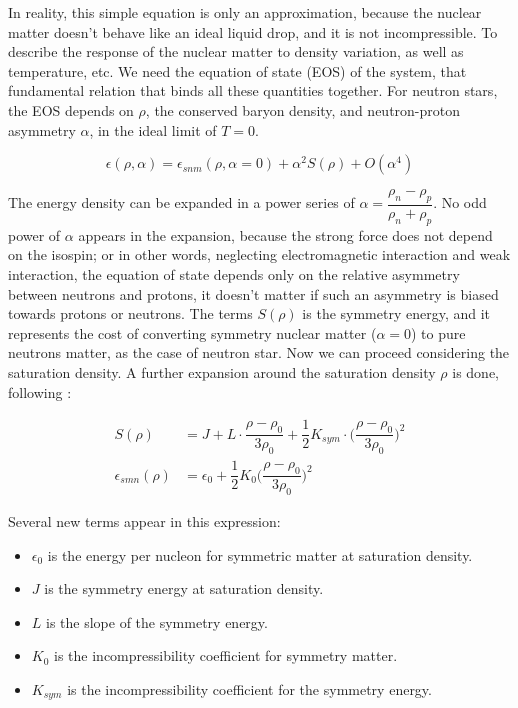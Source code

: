 In reality, this simple equation is only an approximation, because the nuclear matter doesn't behave like an ideal liquid drop, and it is not incompressible. To describe the response of the nuclear matter to density variation, as well as temperature, etc. We need the equation of state (EOS) of the system, that fundamental relation that binds all these quantities together. For neutron stars, the EOS depends on $\rho$, the conserved baryon density, and neutron-proton asymmetry $\alpha$, in the ideal limit of $T = 0$. 

\begin{equation}
\epsilon (\rho,\alpha) = \epsilon_{snm} (\rho, \alpha = 0) + \alpha ^{2} S(\rho) + O(\alpha ^{4})
\end{equation}

The energy density can be expanded in a power series of $\alpha = \dfrac{\rho_{n} - \rho_{p}}{\rho_{n} + \rho_{p}}$. No odd power of $\alpha$ appears in the expansion, because the strong force does not depend on the isospin; or in other words, neglecting electromagnetic interaction and weak interaction, the equation of state depends only on the relative asymmetry between neutrons and protons, it doesn't matter if such an asymmetry is biased towards protons or neutrons. The terms $S(\rho)$ is the symmetry energy, and it represents the cost of converting symmetry nuclear matter ($\alpha = 0$) to pure neutrons matter, as the case of neutron star. Now we can proceed considering the saturation density. A further expansion around the saturation density $\rho$ is done, following \cite{Piekarewicz_2009}:
	
\begin{equation} \label{eq:Lfirst}
\begin{split}
S(\rho) &= J + L \cdot \dfrac{\rho - \rho_{0}}{3 \rho_{0}} + \dfrac{1}{2} K_{sym} \cdot \biggl(\dfrac{\rho - \rho_{0}}{3 \rho_{0}}\biggl)^{2} \\
\epsilon _{smn} (\rho) &= \epsilon_{0} + \dfrac{1}{2}K_{0} \biggl(\dfrac{\rho - \rho_{0}}{3 \rho_{0}} \biggl)^{2} 
\end{split}
\end{equation}

Several new terms appear in this expression:
\begin{itemize}
\item $\epsilon_{0}$ is the energy per nucleon for symmetric matter at saturation density.
\item $J$ is the symmetry energy at saturation density.
\item $L$ is the slope of the symmetry energy.
\item $K_{0}$ is the incompressibility coefficient for symmetry matter. 
\item $K_{sym}$ is the incompressibility coefficient for the symmetry energy.
\end{itemize}

